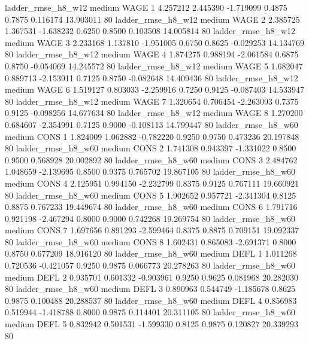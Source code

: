     ladder_rmse_h8_w12     medium     WAGE                 1  4.257212 2.445390 -1.719099 0.4875 0.7875  0.116174   13.903011 80
    ladder_rmse_h8_w12     medium     WAGE                 2  2.385725 1.367531 -1.638232 0.6250 0.8500  0.103508   14.005814 80
    ladder_rmse_h8_w12     medium     WAGE                 3  2.233168 1.137810 -1.951005 0.6750 0.8625 -0.029253   14.134769 80
    ladder_rmse_h8_w12     medium     WAGE                 4  1.874275 0.988194 -2.061584 0.6875 0.8750 -0.054069   14.245572 80
    ladder_rmse_h8_w12     medium     WAGE                 5  1.682047 0.889713 -2.153911 0.7125 0.8750 -0.082648   14.409436 80
    ladder_rmse_h8_w12     medium     WAGE                 6  1.519127 0.803033 -2.259916 0.7250 0.9125 -0.087403   14.533947 80
    ladder_rmse_h8_w12     medium     WAGE                 7  1.320654 0.706454 -2.263093 0.7375 0.9125 -0.098256   14.677634 80
    ladder_rmse_h8_w12     medium     WAGE                 8  1.270200 0.684607 -2.354991 0.7125 0.9000 -0.108113   14.799447 80
    ladder_rmse_h8_w60     medium     CONS                 1  1.824009 1.062882 -0.782220 0.9250 0.9750  0.473236   20.197848 80
    ladder_rmse_h8_w60     medium     CONS                 2  1.741308 0.943397 -1.331022 0.8500 0.9500  0.568928   20.002892 80
    ladder_rmse_h8_w60     medium     CONS                 3  2.484762 1.048659 -2.139695 0.8500 0.9375  0.765702   19.867105 80
    ladder_rmse_h8_w60     medium     CONS                 4  2.125951 0.994150 -2.232799 0.8375 0.9125  0.767111   19.660921 80
    ladder_rmse_h8_w60     medium     CONS                 5  1.902652 0.957721 -2.341304 0.8125 0.8875  0.767233   19.449674 80
    ladder_rmse_h8_w60     medium     CONS                 6  1.791716 0.921198 -2.467294 0.8000 0.9000  0.742268   19.269754 80
    ladder_rmse_h8_w60     medium     CONS                 7  1.697656 0.891293 -2.599464 0.8375 0.8875  0.709151   19.092337 80
    ladder_rmse_h8_w60     medium     CONS                 8  1.602431 0.865083 -2.691371 0.8000 0.8750  0.677209   18.916120 80
    ladder_rmse_h8_w60     medium     DEFL                 1  1.011268 0.720536 -0.421057 0.9250 0.9875  0.066773   20.278263 80
    ladder_rmse_h8_w60     medium     DEFL                 2  0.935701 0.601332 -0.903961 0.9250 0.9625  0.081968   20.282030 80
    ladder_rmse_h8_w60     medium     DEFL                 3  0.890963 0.544749 -1.185678 0.8625 0.9875  0.100488   20.288537 80
    ladder_rmse_h8_w60     medium     DEFL                 4  0.856983 0.519944 -1.418788 0.8000 0.9875  0.114401   20.311105 80
    ladder_rmse_h8_w60     medium     DEFL                 5  0.832942 0.501531 -1.599330 0.8125 0.9875  0.120827   20.339293 80
